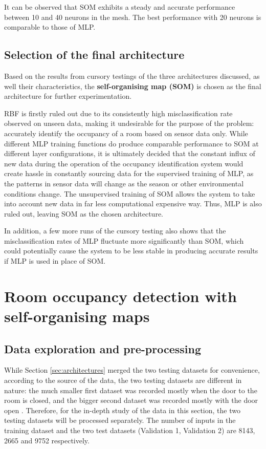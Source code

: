 \documentclass[10pt, oneside]{article}
\begin{document}
It can be observed that SOM exhibits a steady and accurate performance between 10 and 40 neurons in the mesh. The best performance with 20 neurons is comparable to those of MLP.

\subsection{Selection of the final architecture}

Based on the results from cursory testings of the three architectures discussed, as well their characteristics, the \textbf{self-organising map (SOM)} is chosen as the final architecture for further experimentation. 

RBF is firstly ruled out due to its consistently high misclassification rate observed on unseen data, making it undesirable for the purpose of the problem: accurately identify the occupancy of a room based on sensor data only. While different MLP training functions do produce comparable performance to SOM at different layer configurations, it is ultimately decided that the constant influx of new data during the operation of the occupancy identification system would create hassle in constantly sourcing data for the supervised training of MLP, as the patterns in sensor data will change as the season or other environmental conditions change. The unsupervised training of SOM allows the system to take into account new data in far less computational expensive way. Thus, MLP is also ruled out, leaving SOM as the chosen architecture.

In addition, a few more runs of the cursory testing also shows that the misclassification rates of MLP fluctuate more significantly than SOM, which could potentially cause the system to be less stable in producing accurate results if MLP is used in place of SOM. 

\section{Room occupancy detection with self-organising maps}

\subsection{Data exploration and pre-processing} \label{subsec:preprocessing}
While Section \ref{sec:architectures} merged the two testing datasets for convenience, according to the source of the data, the two testing datasets are different in nature: the much smaller first dataset was recorded mostly when the door to the room is closed, and the bigger second dataset was recorded mostly with the door open \cite[Tb. 5]{candanedo2016accurate}. Therefore, for the in-depth study of the data in this section, the two testing datasets will be processed separately. The number of inputs in the training dataset and the two test datasets (Validation 1, Validation 2) are 8143, 2665 and 9752 respectively.
\end{document}
